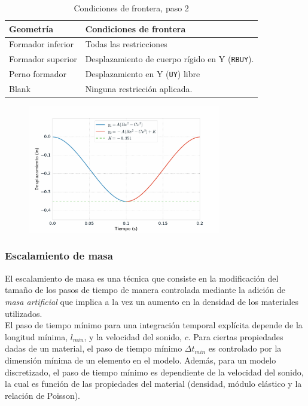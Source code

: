 \begin{table}[H]
\centering
\caption{Condiciones de frontera, paso 2}
\label{}
\begin{tabular}{p{4cm} p{8cm}} \hline
Geometría &  Condiciones de frontera \\
\hline
Formador inferior        & Todas las restricciones   \\
Formador superior        & Desplazamiento de cuerpo rígido en Y (\texttt{RBUY}). \\
Perno formador           & Desplazamiento en Y (\texttt{UY}) libre  \\
Blank                    & Ninguna restricción aplicada. \\
\hline
\end{tabular}
\label{tab:bound_conds_02}
\end{table}

\begin{figure}[H]
\centering
\includegraphics[width=0.75\textwidth]{src/ch3/smooth_displacement_02.pdf}
\label{fig:smooth_displacement_02}
\end{figure}

\subsubsection{Escalamiento de masa}\label{sec:mass-scaling}

El escalamiento de masa es una técnica que consiste en la modificación del tamaño de los 
pasos de tiempo de manera controlada mediante la adición de \textit{masa artificial} que implica 
a la vez un aumento en la densidad de los materiales utilizados.\\

El paso de tiempo mínimo para una integración temporal explícita depende de la longitud mínima, 
$l_{min}$, y la velocidad del sonido, $c$. Para ciertas propiedades dadas de un material, el 
paso de tiempo mínimo $\Delta t_{min}$ es controlado por la dimensión mínima de un elemento 
en el modelo. Además, para un modelo discretizado, el paso de tiempo mínimo es dependiente 
de la velocidad del sonido, la cual es función de las propiedades del material (densidad, 
módulo elástico y la relación de Poisson). ~\cite{lsdyna-ansys-manual} \\

